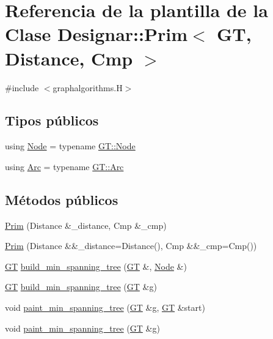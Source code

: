 \hypertarget{class_designar_1_1_prim}{}\section{Referencia de la plantilla de la Clase Designar\+:\+:Prim$<$ GT, Distance, Cmp $>$}
\label{class_designar_1_1_prim}


{\ttfamily \#include $<$graphalgorithms.\+H$>$}

\subsection*{Tipos públicos}
\begin{DoxyCompactItemize}
\item 
using \hyperlink{class_designar_1_1_prim_a61fb55303a5350e0a6dadd5472571ba6}{Node} = typename \hyperlink{class_designar_1_1_graph_a5dfc7dba9d092ac489c72e40390c37d0}{G\+T\+::\+Node}
\item 
using \hyperlink{class_designar_1_1_prim_adb1cb5cb91efc05d2a06b5e0825ed609}{Arc} = typename \hyperlink{class_designar_1_1_graph_a74c730ef4ce2d20f998d72bd25c2b5bf}{G\+T\+::\+Arc}
\end{DoxyCompactItemize}
\subsection*{Métodos públicos}
\begin{DoxyCompactItemize}
\item 
\hyperlink{class_designar_1_1_prim_a72499b6f863776f135b39977e8c981bf}{Prim} (Distance \&\+\_\+distance, Cmp \&\+\_\+cmp)
\item 
\hyperlink{class_designar_1_1_prim_abf866c064ed21f9be1ccb60ed9df84c1}{Prim} (Distance \&\&\+\_\+distance=Distance(), Cmp \&\&\+\_\+cmp=Cmp())
\item 
\hyperlink{demo-buildgraph_8_c_a3001c40d2c31ca87ed96cd7d1334a55e}{GT} \hyperlink{class_designar_1_1_prim_a39e561f33cf1a98dc599d81f01948a16}{build\+\_\+min\+\_\+spanning\+\_\+tree} (\hyperlink{demo-buildgraph_8_c_a3001c40d2c31ca87ed96cd7d1334a55e}{GT} \&, \hyperlink{class_designar_1_1_prim_a61fb55303a5350e0a6dadd5472571ba6}{Node} \&)
\item 
\hyperlink{demo-buildgraph_8_c_a3001c40d2c31ca87ed96cd7d1334a55e}{GT} \hyperlink{class_designar_1_1_prim_a57b6f5db0d64fc287fc6beb5ffb3713d}{build\+\_\+min\+\_\+spanning\+\_\+tree} (\hyperlink{demo-buildgraph_8_c_a3001c40d2c31ca87ed96cd7d1334a55e}{GT} \&g)
\item 
void \hyperlink{class_designar_1_1_prim_ad2f2b01a9c586af106f28906e23bbd30}{paint\+\_\+min\+\_\+spanning\+\_\+tree} (\hyperlink{demo-buildgraph_8_c_a3001c40d2c31ca87ed96cd7d1334a55e}{GT} \&g, \hyperlink{demo-buildgraph_8_c_a3001c40d2c31ca87ed96cd7d1334a55e}{GT} \&start)
\item 
void \hyperlink{class_designar_1_1_prim_a34cd263d3ccef0be04a710bde8d6aa68}{paint\+\_\+min\+\_\+spanning\+\_\+tree} (\hyperlink{demo-buildgraph_8_c_a3001c40d2c31ca87ed96cd7d1334a55e}{GT} \&g)
\end{DoxyCompactItemize}


